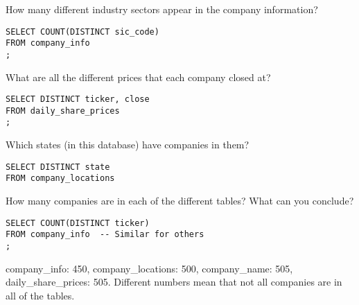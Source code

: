 \documentclass[10pt]{exam}
\begin{document}
\begin{questions}
\question How many different industry sectors appear in the company
information?

\begin{solution}
\begin{lstlisting}
SELECT COUNT(DISTINCT sic_code)
FROM company_info
;
\end{lstlisting}
\end{solution}


\question What are all the different prices that each company closed at?

\begin{solution}
\begin{lstlisting}
SELECT DISTINCT ticker, close
FROM daily_share_prices
;
\end{lstlisting}
\end{solution}


\question Which states (in this database) have companies in them?

\begin{solution}
\begin{lstlisting}
SELECT DISTINCT state
FROM company_locations
\end{lstlisting}
\end{solution}

\question How many companies are in each of the different tables? What can
you conclude?

\begin{solution}
\begin{lstlisting}
SELECT COUNT(DISTINCT ticker)
FROM company_info  -- Similar for others
;
\end{lstlisting}
company\_info: 450, company\_locations: 500, company\_name: 505,
daily\_share\_prices: 505. Different numbers mean that not all companies
are in all of the tables.
\end{solution}

\end{questions}


\newpage
\end{document}
